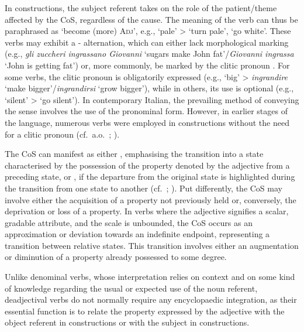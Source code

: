 \documentclass[output=paper,colorlinks,citecolor=brown]{langscibook}
\begin{document}
In  constructions, the subject referent takes on the role of the patient/theme affected by the CoS, regardless of the cause. The meaning of the verb can thus be paraphrased as ‘become (more) \textsc{Adj}’, e.g.,  ‘pale’ >  ‘turn pale’, ‘go white’. These verbs may exhibit a - alternation, which can either lack morphological marking (e.g., \textit{gli zuccheri ingrassano Giovanni} ‘sugars make John fat’/\textit{Giovanni ingrassa}  ‘John is getting fat’) or, more commonly, be marked by the clitic pronoun . For some verbs, the clitic pronoun is obligatorily expressed (e.g.,  ‘big’ > \textit{ingrandire} ‘make bigger’/\textit{ingrandirsi} ‘grow bigger’), while in others, its use is optional (e.g.,  ‘silent’ >  ‘go silent’). In contemporary Italian, the prevailing method of conveying the  sense involves the use of the pronominal form. However, in earlier stages of the language, numerous verbs were employed in  constructions without the need for a clitic pronoun (cf.\ a.o.\ \citealt{Cennamo2015}; \citealt{Bentley2024}).

The CoS  can manifest as either , emphasising the transition into a state characterised by the possession  of the property denoted by the adjective from a preceding state, or , if the departure from the original state is highlighted during the transition from one state to another (cf.\ \citealt{Grossmann1994}; \citealt{Iacobini2021}). Put differently, the CoS may involve either the acquisition of a property not previously held or, conversely, the deprivation or loss of a property. In verbs where the adjective signifies a scalar, gradable attribute, and the scale is unbounded, the CoS  occurs as an approximation or deviation towards an indefinite endpoint, representing a transition between relative states. This transition involves either an augmentation or diminution of a property already possessed to some degree.

Unlike denominal verbs, whose interpretation relies on context and on some kind of knowledge regarding the usual or expected use of the noun referent, deadjectival verbs do not normally require any encyclopaedic integration, as their essential function is to relate the property expressed by the adjective with the object referent in  constructions or with the subject in  constructions.
\end{document}
